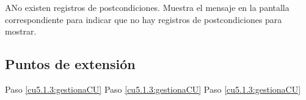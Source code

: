  \begin{UCtrayectoriaA}{A}{No existen registros de postcondiciones.}
    \UCpaso[\UCsist] Muestra el mensaje  en la pantalla correspondiente
    para indicar que no hay registros de postcondiciones para mostrar.
 \end{UCtrayectoriaA}
 

\subsection{Puntos de extensión}

	{Paso \ref{cu5.1.3:gestionaCU}}
	{}
	{Paso \ref{cu5.1.3:gestionaCU}}
	{}
	{Paso \ref{cu5.1.3:gestionaCU}}
	{}
  